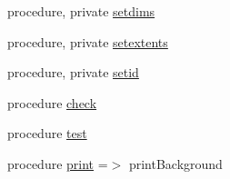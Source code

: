 \begin{DoxyCompactItemize}
\item 
procedure, private \mbox{\hyperlink{structbackground__mod_1_1background__class_a5a4418427175db3e0d549fc328369993}{setdims}}
\item 
procedure, private \mbox{\hyperlink{structbackground__mod_1_1background__class_a2265e90a0a0685465a17721576919af5}{setextents}}
\item 
procedure, private \mbox{\hyperlink{structbackground__mod_1_1background__class_aa9fde21edbd805c17a6610d9db2ef4a4}{setid}}
\item 
procedure \mbox{\hyperlink{structbackground__mod_1_1background__class_ac6df939097034b1b810ab1e4dca9857a}{check}}
\item 
procedure \mbox{\hyperlink{structbackground__mod_1_1background__class_abe7c9e689ba522cbd15754980ef1cc47}{test}}
\item 
procedure \mbox{\hyperlink{structbackground__mod_1_1background__class_aa1c611fb6813d423cba8f53bdf25465d}{print}} =$>$ print\+Background
\end{DoxyCompactItemize}
